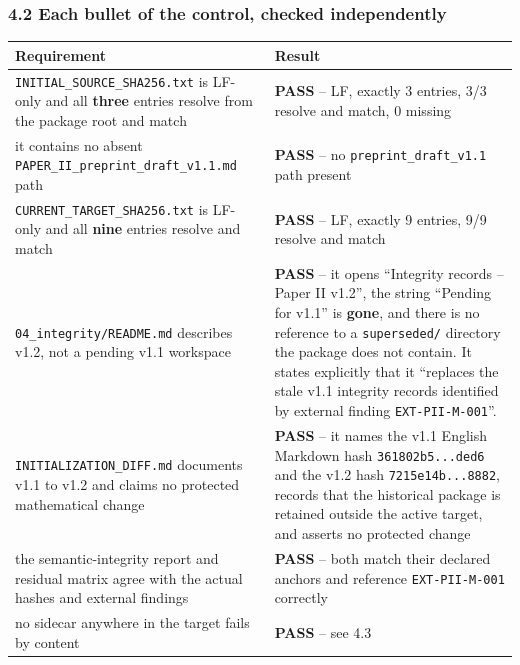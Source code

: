 \documentclass[
  10pt,
]{article}
\newcounter{none} %
\begin{document}
\subsubsection{4.2 Each bullet of the control, checked
independently}\label{each-bullet-of-the-control-checked-independently}

{\def\LTcaptype{none} %
\begin{longtable}[]{@{}
  >{\raggedright\arraybackslash}p{}
  >{\raggedright\arraybackslash}p{}@{}}
\toprule\noalign{}
\begin{minipage}[b]{\linewidth}\raggedright
Requirement
\end{minipage} & \begin{minipage}[b]{\linewidth}\raggedright
Result
\end{minipage} \\
\midrule\noalign{}
\endhead
\bottomrule\noalign{}
\endlastfoot
\texttt{INITIAL\_SOURCE\_SHA256.txt} is LF-only and all \textbf{three}
entries resolve from the package root and match & \textbf{PASS} -- LF,
exactly 3 entries, 3/3 resolve and match, 0 missing \\
it contains no absent \texttt{PAPER\_II\_preprint\_draft\_v1.1.md} path
& \textbf{PASS} -- no \texttt{preprint\_draft\_v1.1} path present \\
\texttt{CURRENT\_TARGET\_SHA256.txt} is LF-only and all \textbf{nine}
entries resolve and match & \textbf{PASS} -- LF, exactly 9 entries, 9/9
resolve and match \\
\texttt{04\_integrity/README.md} describes v1.2, not a pending v1.1
workspace & \textbf{PASS} -- it opens ``Integrity records -- Paper II
v1.2'', the string ``Pending for v1.1'' is \textbf{gone}, and there is
no reference to a \texttt{superseded/} directory the package does not
contain. It states explicitly that it ``replaces the stale v1.1
integrity records identified by external finding
\texttt{EXT-PII-M-001}''. \\
\texttt{INITIALIZATION\_DIFF.md} documents v1.1 to v1.2 and claims no
protected mathematical change & \textbf{PASS} -- it names the v1.1
English Markdown hash \texttt{361802b5...ded6} and the v1.2 hash
\texttt{7215e14b...8882}, records that the historical package is
retained outside the active target, and asserts no protected change \\
the semantic-integrity report and residual matrix agree with the actual
hashes and external findings & \textbf{PASS} -- both match their
declared anchors and reference \texttt{EXT-PII-M-001} correctly \\
no sidecar anywhere in the target fails by content & \textbf{PASS} --
see 4.3 \\
\end{longtable}
}
\end{document}
